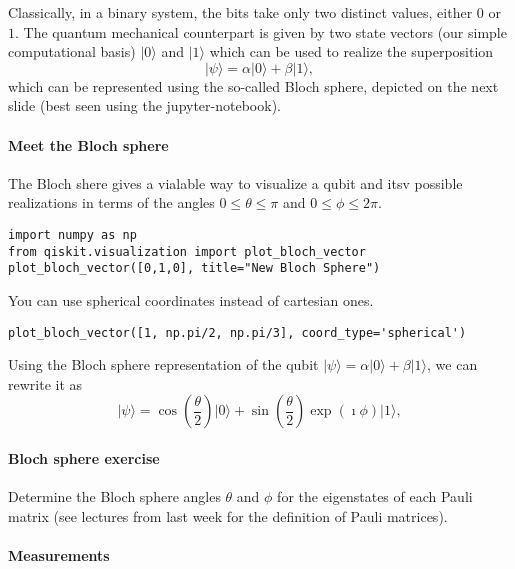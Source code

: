 Classically, in a binary system, the bits take only two distinct
values, either $0$ or $1$.  The quantum mechanical counterpart is
given by two state vectors (our simple computational basis)
$\vert 0 \rangle$ and $\vert 1\rangle $ which can be used to realize the
superposition
\[
\vert \psi \rangle = \alpha \vert 0 \rangle +\beta\vert 1\rangle, 
\]
which can be represented using the so-called Bloch sphere, depicted on the next slide (best seen using the jupyter-notebook).


\paragraph{Meet the Bloch sphere}
The Bloch shere gives a vialable way to visualize a qubit and itsv possible realizations in terms of the angles $0\le \theta \le \pi$ and
$0\le \phi \le 2\pi$. 




\begin{Verbatim}[numbers=none,fontsize=\fontsize{9pt}{9pt},baselinestretch=0.95]
import numpy as np
from qiskit.visualization import plot_bloch_vector
plot_bloch_vector([0,1,0], title="New Bloch Sphere")

\end{Verbatim}

You can use spherical coordinates instead of cartesian ones.


\begin{Verbatim}[numbers=none,fontsize=\fontsize{9pt}{9pt},baselinestretch=0.95]
plot_bloch_vector([1, np.pi/2, np.pi/3], coord_type='spherical')

\end{Verbatim}

Using the Bloch sphere representation of the qubit $\vert \psi \rangle = \alpha \vert 0 \rangle +\beta\vert 1\rangle$, we can rewrite it as
\[
\vert \psi \rangle = \cos{(\frac{\theta}{2})} \vert 0 \rangle +\sin{(\frac{\theta}{2})}\exp{(\imath\phi)}\vert 1\rangle, 
\]


\paragraph{Bloch sphere exercise}

Determine the Bloch sphere angles $\theta$ and $\phi$ for the eigenstates of each Pauli matrix (see lectures from last week for the definition of Pauli matrices).


\paragraph{Measurements}

